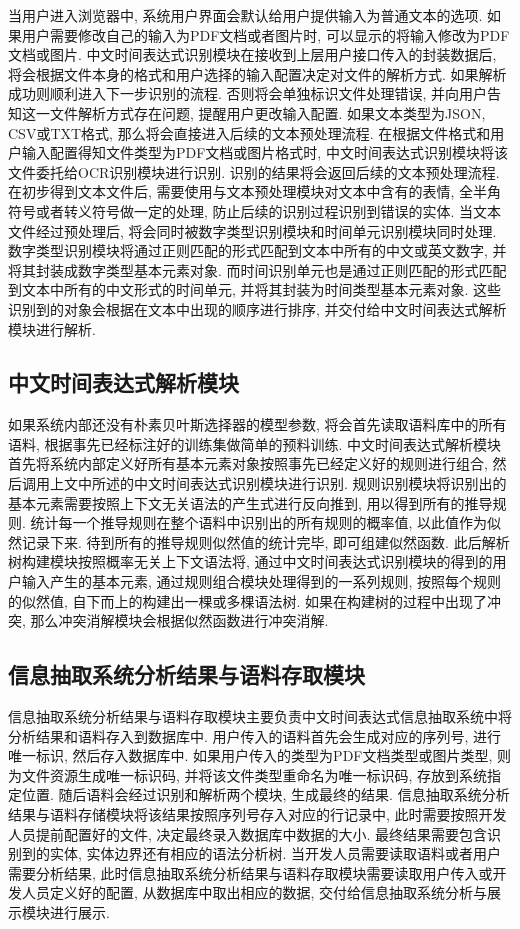 当用户进入浏览器中, 系统用户界面会默认给用户提供输入为普通文本的选项. 如果用户需要修改自己的输入为PDF文档或者图片时, 可以显示的将输入修改为PDF文档或图片.
中文时间表达式识别模块在接收到上层用户接口传入的封装数据后, 将会根据文件本身的格式和用户选择的输入配置决定对文件的解析方式. 如果解析成功则顺利进入下一步识别的流程.
否则将会单独标识文件处理错误, 并向用户告知这一文件解析方式存在问题, 提醒用户更改输入配置.
如果文本类型为JSON, CSV或TXT格式, 那么将会直接进入后续的文本预处理流程.
在根据文件格式和用户输入配置得知文件类型为PDF文档或图片格式时, 中文时间表达式识别模块将该文件委托给OCR识别模块进行识别. 识别的结果将会返回后续的文本预处理流程.
在初步得到文本文件后, 需要使用与文本预处理模块对文本中含有的表情, 全半角符号或者转义符号做一定的处理, 防止后续的识别过程识别到错误的实体.
当文本文件经过预处理后, 将会同时被数字类型识别模块和时间单元识别模块同时处理.
数字类型识别模块将通过正则匹配的形式匹配到文本中所有的中文或英文数字, 并将其封装成数字类型基本元素对象.
而时间识别单元也是通过正则匹配的形式匹配到文本中所有的中文形式的时间单元, 并将其封装为时间类型基本元素对象.
这些识别到的对象会根据在文本中出现的顺序进行排序, 并交付给中文时间表达式解析模块进行解析.

\subsection{中文时间表达式解析模块}

如果系统内部还没有朴素贝叶斯选择器的模型参数, 将会首先读取语料库中的所有语料, 根据事先已经标注好的训练集做简单的预料训练.
中文时间表达式解析模块首先将系统内部定义好所有基本元素对象按照事先已经定义好的规则进行组合, 然后调用上文中所述的中文时间表达式识别模块进行识别.
规则识别模块将识别出的基本元素需要按照上下文无关语法的产生式进行反向推到, 用以得到所有的推导规则.
统计每一个推导规则在整个语料中识别出的所有规则的概率值, 以此值作为似然记录下来. 待到所有的推导规则似然值的统计完毕, 即可组建似然函数.
此后解析树构建模块按照概率无关上下文语法将, 通过中文时间表达式识别模块的得到的用户输入产生的基本元素, 通过规则组合模块处理得到的一系列规则,
按照每个规则的似然值, 自下而上的构建出一棵或多棵语法树.
如果在构建树的过程中出现了冲突, 那么冲突消解模块会根据似然函数进行冲突消解.

\subsection{信息抽取系统分析结果与语料存取模块}

信息抽取系统分析结果与语料存取模块主要负责中文时间表达式信息抽取系统中将分析结果和语料存入到数据库中.
用户传入的语料首先会生成对应的序列号, 进行唯一标识, 然后存入数据库中.
如果用户传入的类型为PDF文档类型或图片类型, 则为文件资源生成唯一标识码, 并将该文件类型重命名为唯一标识码, 存放到系统指定位置.
随后语料会经过识别和解析两个模块, 生成最终的结果.
信息抽取系统分析结果与语料存储模块将该结果按照序列号存入对应的行记录中, 此时需要按照开发人员提前配置好的文件, 决定最终录入数据库中数据的大小.
最终结果需要包含识别到的实体, 实体边界还有相应的语法分析树.
当开发人员需要读取语料或者用户需要分析结果, 此时信息抽取系统分析结果与语料存取模块需要读取用户传入或开发人员定义好的配置, 从数据库中取出相应的数据,
交付给信息抽取系统分析与展示模块进行展示.

